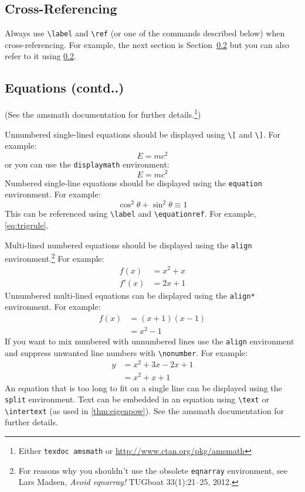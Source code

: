 \documentclass[ml4h-mathphys]{ml4h-jnl}%
\theoremstyle{thmstyleone}%
\theoremstyle{thmstyletwo}%
\theoremstyle{thmstylethree}%
\begin{document}
\subsection{Cross-Referencing}

Always use \verb|\label| and \verb|\ref| (or one of the commands
described below) when cross-referencing.  For example, the next
section is Section~\ref{sec:math} but you can also refer to it using
\ref{sec:math}.  
 
\subsection{Equations (contd..)}
\label{sec:math}

(See the \textsf{amsmath} documentation for further
details.\footnote{Either \texttt{texdoc amsmath} or
\url{http://www.ctan.org/pkg/amsmath}})

Unnumbered single-lined equations should be displayed using
\verb|\[| and \verb|\]|. For example:
\[E = m c^2\]
or you can use the \texttt{displaymath} environment:
\begin{displaymath}
E = m c^2
\end{displaymath}
Numbered single-line equations should be displayed using the
\texttt{equation} environment. For example:
\begin{equation}\label{eq:trigrule}
\cos^2\theta + \sin^2\theta \equiv 1
\end{equation}
This can be referenced using \verb|\label| and \verb|\equationref|.
For example, \ref{eq:trigrule}.

Multi-lined numbered equations should be displayed using the
\texttt{align} environment.\footnote{For reasons why you 
shouldn't use the obsolete \texttt{eqnarray} environment, see
Lars Madsen, \emph{Avoid eqnarray!} TUGboat 33(1):21--25, 2012.} For example:
\begin{align}
f(x) &= x^2 + x\label{eq:f}\\
f'(x) &= 2x + 1\label{eq:df}
\end{align}
Unnumbered multi-lined equations can be displayed using the
\texttt{align*} environment. For example:
\begin{align*}
f(x) &= (x+1)(x-1)\\
&= x^2 - 1
\end{align*}
If you want to mix numbered with unnumbered lines use the
\texttt{align} environment and suppress unwanted line numbers with
\verb|\nonumber|. For example:
\begin{align}
y &= x^2 + 3x - 2x + 1\nonumber\\
&= x^2 + x + 1\label{eq:y}
\end{align}
An equation that is too long to fit on a single line can be
displayed using the \texttt{split} environment. 
Text can be embedded in an equation using \verb|\text| or
\verb|\intertext| (as used in \ref{thm:eigenpow}).
See the \textsf{amsmath} documentation for further details.
\end{document}
